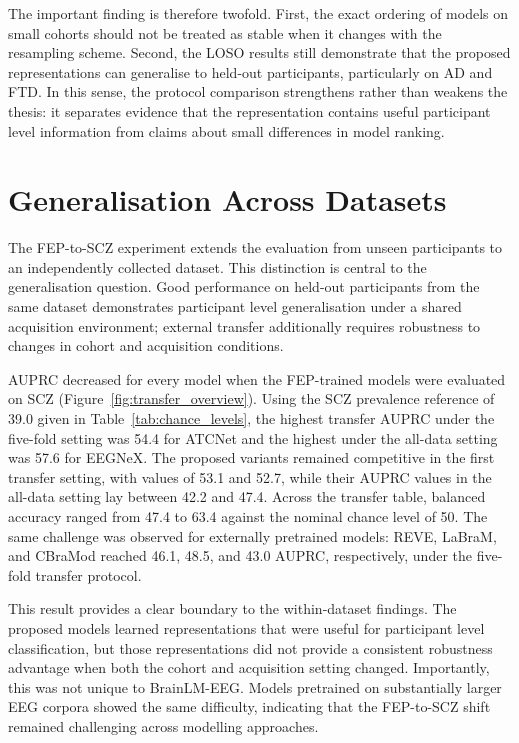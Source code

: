 The important finding is therefore twofold. First, the exact ordering of models on small cohorts should not be treated as stable when it changes with the resampling scheme. Second, the LOSO results still demonstrate that the proposed representations can generalise to held-out participants, particularly on AD and FTD. In this sense, the protocol comparison strengthens rather than weakens the thesis: it separates evidence that the representation contains useful participant level information from claims about small differences in model ranking.

\section{Generalisation Across Datasets}\label{sec:d_transfer}

The FEP-to-SCZ experiment extends the evaluation from unseen participants to an independently collected dataset. This distinction is central to the generalisation question. Good performance on held-out participants from the same dataset demonstrates participant level generalisation under a shared acquisition environment; external transfer additionally requires robustness to changes in cohort and acquisition conditions.

AUPRC decreased for every model when the FEP-trained models were evaluated on SCZ (Figure~\ref{fig:transfer_overview}). Using the SCZ prevalence reference of 39.0 given in Table~\ref{tab:chance_levels}, the highest transfer AUPRC under the five-fold setting was 54.4 for ATCNet and the highest under the all-data setting was 57.6 for EEGNeX. The proposed variants remained competitive in the first transfer setting, with values of 53.1 and 52.7, while their AUPRC values in the all-data setting lay between 42.2 and 47.4. Across the transfer table, balanced accuracy ranged from 47.4 to 63.4 against the nominal chance level of 50. The same challenge was observed for externally pretrained models: REVE, LaBraM, and CBraMod reached 46.1, 48.5, and 43.0 AUPRC, respectively, under the five-fold transfer protocol.

This result provides a clear boundary to the within-dataset findings. The proposed models learned representations that were useful for participant level classification, but those representations did not provide a consistent robustness advantage when both the cohort and acquisition setting changed. Importantly, this was not unique to BrainLM-EEG. Models pretrained on substantially larger EEG corpora showed the same difficulty, indicating that the FEP-to-SCZ shift remained challenging across modelling approaches.

